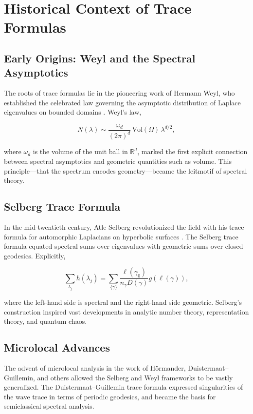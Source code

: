 \section{Historical Context of Trace Formulas}

\subsection{Early Origins: Weyl and the Spectral Asymptotics}

The roots of trace formulas lie in the pioneering work of Hermann Weyl, who
established the celebrated law governing the asymptotic distribution of Laplace
eigenvalues on bounded domains \cite{Weyl1912}. Weyl’s law,

\[
N(\lambda) \sim \frac{\omega_d}{(2\pi)^d}\,\mathrm{Vol}(\Omega)\,\lambda^{d/2},
\]

where $\omega_d$ is the volume of the unit ball in $\mathbb{R}^d$, marked the first
explicit connection between spectral asymptotics and geometric quantities such as
volume. This principle—that the spectrum encodes geometry—became the leitmotif of
spectral theory.

\subsection{Selberg Trace Formula}

In the mid-twentieth century, Atle Selberg revolutionized the field with his trace
formula for automorphic Laplacians on hyperbolic surfaces \cite{Selberg1956}. The
Selberg trace formula equated spectral sums over eigenvalues with geometric sums over
closed geodesics. Explicitly,

\[
\sum_{\lambda_j} h(\lambda_j) = \sum_{\{\gamma\}} \frac{\ell(\gamma_0)}{n_\gamma D(\gamma)} g(\ell(\gamma)),
\]

where the left-hand side is spectral and the right-hand side geometric. Selberg’s
construction inspired vast developments in analytic number theory, representation
theory, and quantum chaos.

\subsection{Microlocal Advances}

The advent of microlocal analysis in the work of H\"ormander, Duistermaat–Guillemin,
and others allowed the Selberg and Weyl frameworks to be vastly generalized. The
Duistermaat–Guillemin trace formula \cite{DG1975} expressed singularities of the wave
trace in terms of periodic geodesics, and became the basis for semiclassical spectral
analysis.

